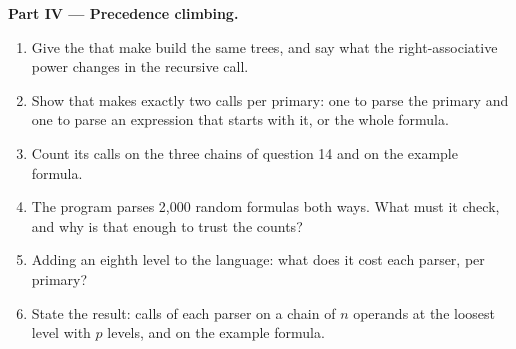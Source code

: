 \begin{problem}
\medskip\noindent\textbf{Part IV --- Precedence climbing.}
\begin{enumerate}[resume]
\item Give the  that make  build the same trees, and say what the right-associative power changes in the recursive call.
\item Show that  makes exactly two calls per primary: one to parse the primary and one to parse an expression that starts with it, or the whole formula.
\item Count its calls on the three chains of question 14 and on the example formula.
\item The program parses 2,000 random formulas both ways. What must it check, and why is that enough to trust the counts?
\item Adding an eighth level to the language: what does it cost each parser, per primary?
\item State the result: calls of each parser on a chain of $n$ operands at the loosest level with $p$ levels, and on the example formula.
\end{enumerate}
\end{problem}
